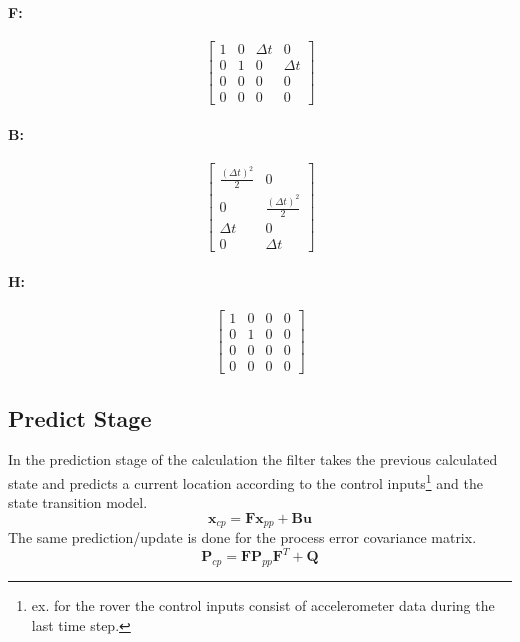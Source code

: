 \documentclass{article}
\begin{document}
\paragraph{\textbf{F:}}
$$
\begin{bmatrix}
    1 & 0 & \Delta t & 0\\
    0 & 1 & 0 &  \Delta t\\
    0 & 0 & 0 & 0\\
    0 & 0 & 0 & 0
\end{bmatrix}
$$
\paragraph{\textbf{B:}}
$$
\begin{bmatrix}
    \frac{(\Delta t)^2}{2} & 0\\
    0 & \frac{(\Delta t)^2}{2}\\
    \Delta t & 0\\
    0 & \Delta t
\end{bmatrix}
$$
\paragraph{\textbf{H:}}
$$
\begin{bmatrix}
    1 & 0 & 0 & 0\\
    0 & 1 & 0 & 0\\
    0 & 0 & 0 & 0\\
    0 & 0 & 0 & 0
\end{bmatrix}
$$


\subsection{Predict Stage}
In the prediction stage of the calculation the filter takes the previous calculated state and predicts a current location according to the control inputs\footnote{ex. for the rover the control inputs consist of accelerometer data during the last time step.} and the state transition model.
\begin{equation}
\textbf{x}_{cp}=\textbf{F}\textbf{x}_{pp}+\textbf{B}\textbf{u}
\end{equation} 
The same prediction/update is done for the process error covariance matrix.
\begin{equation}
\textbf{P}_{cp}=\textbf{F}\textbf{P}_{pp}\textbf{F}^T+\textbf{Q}
\end{equation}
\end{document}

